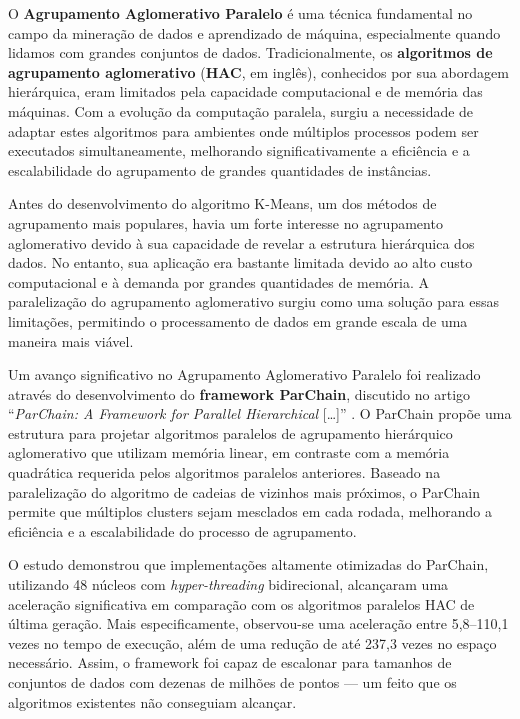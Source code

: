 \documentclass[12pt, %
openright, 
oneside, %
a4paper,    %
brazil]{facom-ufu-abntex2}
\begin{document}
O \textbf{Agrupamento Aglomerativo Paralelo} é uma técnica fundamental no campo da mineração de dados e aprendizado de máquina, especialmente quando lidamos com grandes conjuntos de dados. Tradicionalmente, os \textbf{algoritmos de agrupamento aglomerativo} (\textbf{HAC}, em inglês), conhecidos por sua abordagem hierárquica, eram limitados pela capacidade computacional e de memória das máquinas. Com a evolução da computação paralela, surgiu a necessidade de adaptar estes algoritmos para ambientes onde múltiplos processos podem ser executados simultaneamente, melhorando significativamente a eficiência e a escalabilidade do agrupamento de grandes quantidades de instâncias.

Antes do desenvolvimento do algoritmo K-Means, um dos métodos de agrupamento mais populares, havia um forte interesse no agrupamento aglomerativo devido à sua capacidade de revelar a estrutura hierárquica dos dados. No entanto, sua aplicação era bastante limitada devido ao alto custo computacional e à demanda por grandes quantidades de memória. A paralelização do agrupamento aglomerativo surgiu como uma solução para essas limitações, permitindo o processamento de dados em grande escala de uma maneira mais viável.

Um avanço significativo no Agrupamento Aglomerativo Paralelo foi realizado através do desenvolvimento do \textbf{framework ParChain}, discutido no artigo \enquote{\textit{ParChain: A Framework for Parallel Hierarchical} [\dots]} \cite{parChainHAC2021}. O ParChain propõe uma estrutura para projetar algoritmos paralelos de agrupamento hierárquico aglomerativo que utilizam memória linear, em contraste com a memória quadrática requerida pelos algoritmos paralelos anteriores. Baseado na paralelização do algoritmo de cadeias de vizinhos mais próximos, o ParChain permite que múltiplos clusters sejam mesclados em cada rodada, melhorando a eficiência e a escalabilidade do processo de agrupamento.

O estudo demonstrou que implementações altamente otimizadas do ParChain, utilizando 48 núcleos com \textit{hyper-threading} bidirecional, alcançaram uma aceleração significativa em comparação com os algoritmos paralelos HAC de última geração. Mais especificamente, observou-se uma aceleração entre 5,8--110,1 vezes no tempo de execução, além de uma redução de até 237,3 vezes no espaço necessário. Assim, o framework foi capaz de escalonar para tamanhos de conjuntos de dados com dezenas de milhões de pontos --- um feito que os algoritmos existentes não conseguiam alcançar.
\end{document}

